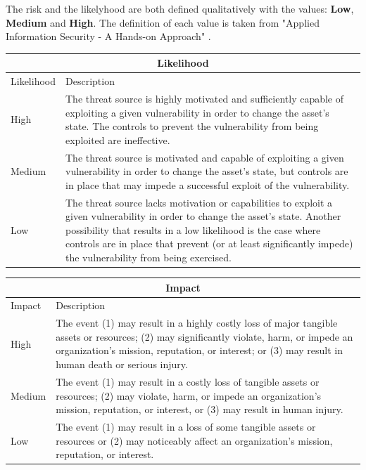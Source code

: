 \documentclass[english]{article}
\begin{document}



The risk and the likelyhood are both defined qualitatively with the values: \textbf{Low}, \textbf{Medium} and \textbf{High}. The definition of each value is taken from "Applied Information Security - A Hands-on Approach" \cite{basin2011applied}.

\begin{center}
\begin{table}[h]
\begin{tabularx}{\textwidth}{|l|X|}
\hline
\multicolumn{2}{|c|}{\bf Likelihood} \\
\hline
Likelihood & Description \\
\hline
\hline
High & The threat source is highly motivated and sufficiently capable of exploiting a given vulnerability in order to change the asset’s state. The controls to prevent the vulnerability from being exploited are ineffective.\\
\hline
Medium & The threat source is motivated and capable of exploiting a given vulnerability in order to change the asset’s state, but controls are in place that may impede a successful exploit of the vulnerability. \\
\hline
Low   & The threat source lacks motivation or capabilities to exploit a given vulnerability in order to change the asset’s state. Another possibility that results in a low likelihood is the case where controls are in place that prevent (or at least significantly impede) the vulnerability from being exercised. \\
\hline
\end{tabularx}
\end{table}
\hspace{3em}
\begin{table}[h]
\begin{tabularx}{\textwidth}{|l|X|}
\hline
\multicolumn{2}{|c|}{\bf Impact} \\
\hline
Impact & Description \\
\hline
\hline
High   & The event (1) may result in a highly costly loss of major tangible assets or resources; (2) may significantly violate, harm, or impede an organization’s mission, reputation, or interest; or (3) may result in human death or serious injury. \\
\hline
Medium & The event (1) may result in a costly loss of tangible assets or resources; (2) may violate, harm, or impede an organization’s mission, reputation, or interest, or (3) may result in human injury.\\
\hline
Low & The event (1) may result in a loss of some tangible assets or resources or (2) may noticeably affect an organization’s mission, reputation, or interest.\\
\hline
\end{tabularx}
\end{table}
\end{center}
\end{document}
